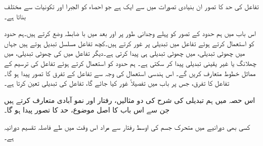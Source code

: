 تفاعل کی حد کا تصور ان بنیادی تصورات میں سے ایک ہے جو احصاء کو الجبرا اور تکونیات سے  مختلف بناتا ہے۔

اس باب میں ہم حدود کے تصور کو پہلے وجدانی طور پر اور بعد میں با ضابطہ وضع کرتے ہیں۔ہم حدود کو استعمال کرتے ہوئے تفاعل  میں تبدیلی پر غور کرتے ہیں۔کچھ تفاعل مسلسل تبدیل ہوتے ہیں جہاں  میں چھوٹی تبدیلی،  میں چھوٹی تبدیلی ہی پیدا کرتی ہے۔دیگر تفاعل میں  کی چھوٹی تبدیلی،  میں چھلانگ یا غیر یقینی تبدیلی  پیدا کر سکتی ہے۔ ہم حدود کو استعمال کرتے ہوئے تفاعل کی ترسیم کے مماثل خطوط متعارف کریں گے۔ اس ہندسی استعمال کی وجہ سے  تفاعل کے تفرق کا تصور پیدا ہو گا۔تفاعل کا تفرق، جس پر  باب  میں تفصیلاً غور کیا جائے گا، تفاعل کی تبدیلی   تعین کرتا ہے۔

اس حصہ میں ہم تبدیلی کی شرح کی دو مثالیں، رفتار اور نمو آبادی متعارف کرتے ہیں جن سے اس باب کا اصل موضوع، حد کا تصور پیدا ہو گا۔

کسی بھی دورانیے میں متحرک جسم کی اوسط رفتار سے مراد اس وقت میں طے فاصلہ تقسیم دورانیہ ہے۔

